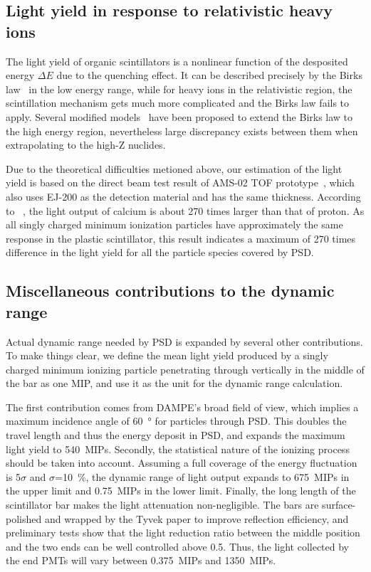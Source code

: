 \documentclass[5p, times]{elsarticle}
\begin{document}
\subsection{Light yield in response to relativistic heavy ions}
The light yield of organic scintillators is a nonlinear function of the desposited energy $\Delta E$ due to the quenching effect.
It can be described precisely by the Birks law~\cite{birks_theory_2013} in the low energy range, while for heavy ions in the relativistic region, the scintillation mechanism gets much more complicated and the Birks law fails to apply.
Several modified models~\cite{chou_nature_1952,tarle_cosmic_1979,menchaca-rocha_response_1999,matsufuji_response_1999} have been proposed to extend the Birks law to the high energy region, nevertheless large discrepancy exists between them when extrapolating to the high-Z nuclides.

Due to the theoretical difficulties metioned above, our estimation of the light yield is based on the direct beam test result of AMS-02 TOF prototype~\cite{marrocchesi2011beam}, which also uses EJ-200 as the detection material and has the same thickness.
According to ~\cite{marrocchesi2011beam}, the light output of calcium is about 270 times larger than that of proton.
As all singly charged minimum ionization particles have approximately the same response in the plastic scintillator, this result indicates a maximum of 270 times difference in the light yield for all the particle species covered by PSD.

\subsection{Miscellaneous contributions to the dynamic range}

Actual dynamic range needed by PSD is expanded by several other contributions. 
To make things clear, we define the mean light yield produced by a singly charged minimum ionizing particle penetrating through vertically in the middle of the bar as one MIP, and use it as the unit for the dynamic range calculation.

The first contribution comes from DAMPE's broad field of view, which implies a maximum incidence angle of \SI{60}{\degree} for particles through PSD.
This doubles the travel length and thus the energy deposit in PSD, and expands the maximum light yield to \SI{540}{MIPs}.  
Secondly, the statistical nature of the ionizing process should be taken into account.
Assuming a full coverage of the energy fluctuation is 5$\sigma$ and $\sigma$=\SI{10}{\percent}, the dynamic range of light output expands to \SI{675}{MIPs} in the upper limit and \SI{0.75}{MIPs} in the lower limit. 
Finally, the long length of the scintillator bar makes the light attenuation non-negligible.
The bars are surface-polished and wrapped by the Tyvek paper to improve reflection efficiency, and preliminary tests show that the light reduction ratio between the middle position and the two ends can be well controlled above 0.5.
Thus, the light collected by the end PMTs will vary between \SI{0.375}{MIPs} and \SI{1350}{MIPs}.
\end{document}
